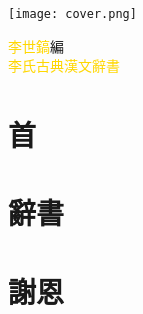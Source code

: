 \documentclass[a5paper,11pt]{report}
\begin{document}
\begin{titlepage}
\doublespacing
\hfill
\vfill
\hspace{-40mm}
\texttt{[image: cover.png]}
\vfill
\begin{flushright}
{\textcolor{gold}{李世鎬}\hspace{14pt}編\hfill{ }}\\
\vspace{14pt}
{\huge\textcolor{gold}{李氏古典漢文辭書}}
\end{flushright}
\vfill
\end{titlepage}
\newpage
\chapter*{首}
\doublespacing


\chapter*{辭書}
\begin{multicols}{3}
\begin{flushleft}
\onehalfspacing

\end{flushleft}
\end{multicols}

\chapter*{謝恩}
\doublespacing

\end{document}

